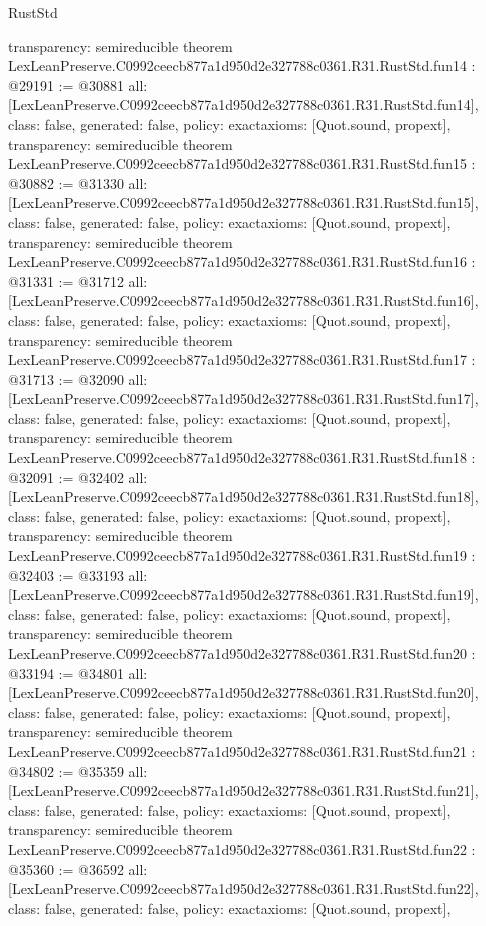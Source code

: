 \begin{lexlean}{RustStd}
\begin{coremodule}
{  transparency: semireducible
}
theorem LexLeanPreserve.C0992ceecb877a1d950d2e327788c0361.R31.RustStd.fun14 : @29191 := @30881 {
  all: [LexLeanPreserve.C0992ceecb877a1d950d2e327788c0361.R31.RustStd.fun14],
  class: false,
  generated: false,
  policy: exact{axioms: [Quot.sound, propext]},
  transparency: semireducible
}
theorem LexLeanPreserve.C0992ceecb877a1d950d2e327788c0361.R31.RustStd.fun15 : @30882 := @31330 {
  all: [LexLeanPreserve.C0992ceecb877a1d950d2e327788c0361.R31.RustStd.fun15],
  class: false,
  generated: false,
  policy: exact{axioms: [Quot.sound, propext]},
  transparency: semireducible
}
theorem LexLeanPreserve.C0992ceecb877a1d950d2e327788c0361.R31.RustStd.fun16 : @31331 := @31712 {
  all: [LexLeanPreserve.C0992ceecb877a1d950d2e327788c0361.R31.RustStd.fun16],
  class: false,
  generated: false,
  policy: exact{axioms: [Quot.sound, propext]},
  transparency: semireducible
}
theorem LexLeanPreserve.C0992ceecb877a1d950d2e327788c0361.R31.RustStd.fun17 : @31713 := @32090 {
  all: [LexLeanPreserve.C0992ceecb877a1d950d2e327788c0361.R31.RustStd.fun17],
  class: false,
  generated: false,
  policy: exact{axioms: [Quot.sound, propext]},
  transparency: semireducible
}
theorem LexLeanPreserve.C0992ceecb877a1d950d2e327788c0361.R31.RustStd.fun18 : @32091 := @32402 {
  all: [LexLeanPreserve.C0992ceecb877a1d950d2e327788c0361.R31.RustStd.fun18],
  class: false,
  generated: false,
  policy: exact{axioms: [Quot.sound, propext]},
  transparency: semireducible
}
theorem LexLeanPreserve.C0992ceecb877a1d950d2e327788c0361.R31.RustStd.fun19 : @32403 := @33193 {
  all: [LexLeanPreserve.C0992ceecb877a1d950d2e327788c0361.R31.RustStd.fun19],
  class: false,
  generated: false,
  policy: exact{axioms: [Quot.sound, propext]},
  transparency: semireducible
}
theorem LexLeanPreserve.C0992ceecb877a1d950d2e327788c0361.R31.RustStd.fun20 : @33194 := @34801 {
  all: [LexLeanPreserve.C0992ceecb877a1d950d2e327788c0361.R31.RustStd.fun20],
  class: false,
  generated: false,
  policy: exact{axioms: [Quot.sound, propext]},
  transparency: semireducible
}
theorem LexLeanPreserve.C0992ceecb877a1d950d2e327788c0361.R31.RustStd.fun21 : @34802 := @35359 {
  all: [LexLeanPreserve.C0992ceecb877a1d950d2e327788c0361.R31.RustStd.fun21],
  class: false,
  generated: false,
  policy: exact{axioms: [Quot.sound, propext]},
  transparency: semireducible
}
theorem LexLeanPreserve.C0992ceecb877a1d950d2e327788c0361.R31.RustStd.fun22 : @35360 := @36592 {
  all: [LexLeanPreserve.C0992ceecb877a1d950d2e327788c0361.R31.RustStd.fun22],
  class: false,
  generated: false,
  policy: exact{axioms: [Quot.sound, propext]},
}
\end{coremodule}
\end{lexlean}
